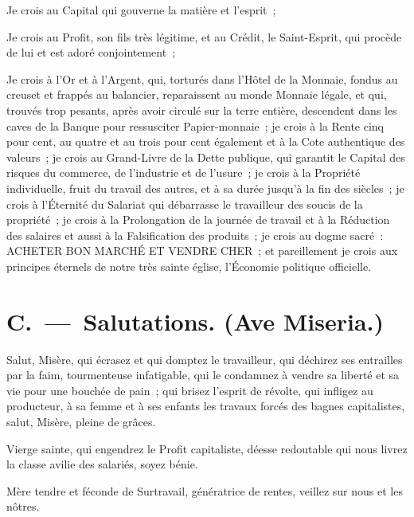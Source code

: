 \documentclass[french,twoside]{book} %
\begin{document}
Je crois au Capital qui gouverne la matière et l’esprit ;\par
Je crois au Profit, son fils très légitime, et au Crédit, le Saint-Esprit, qui procède de lui et est adoré conjointement ;\par
Je crois à l’Or et à l’Argent, qui, torturés dans l’Hôtel de la Monnaie, fondus au creuset et frappés au balancier, reparaissent au monde Monnaie légale, et qui, trouvés trop pesants, après avoir circulé sur la terre entière, descendent dans les caves de la Banque pour ressusciter Papier-monnaie ; je crois à la Rente cinq pour cent, au quatre et au trois pour cent également et à la Cote authentique des valeurs ; je crois au Grand-Livre de la Dette publique, qui garantit le Capital des risques du commerce, de l’industrie et de l’usure ; je crois à la Propriété individuelle, fruit du travail des autres, et à sa durée jusqu’à la fin des siècles ; je crois à l’Éternité du Salariat qui débarrasse le travailleur des soucis de la propriété ; je crois à la Prolongation de la journée de travail et à la Réduction des salaires et aussi à la Falsification des produits ; je crois au dogme sacré : ACHETER BON MARCHÉ ET VENDRE CHER ; et pareillement je crois aux principes éternels de notre très sainte église, l’Économie politique officielle.\par

\begin{center}
\end{center}


\section[{C. — Salutations. (Ave Miseria.)}]{C. — Salutations. (Ave Miseria.)}

\noindent Salut, Misère, qui écrasez et qui domptez le travailleur, qui déchirez ses entrailles par la faim, tourmenteuse infatigable, qui le condamnez à vendre sa liberté et sa vie pour une bouchée de pain ; qui brisez l’esprit de révolte, qui infligez au producteur, à sa femme et à ses enfants les travaux forcés des bagnes capitalistes, salut, Misère, pleine de grâces.\par
Vierge sainte, qui engendrez le Profit capitaliste, déesse redoutable qui nous livrez la classe avilie des salariés, soyez bénie.\par
Mère tendre et féconde de Surtravail, génératrice de rentes, veillez sur nous et les nôtres.\par
\end{document}
